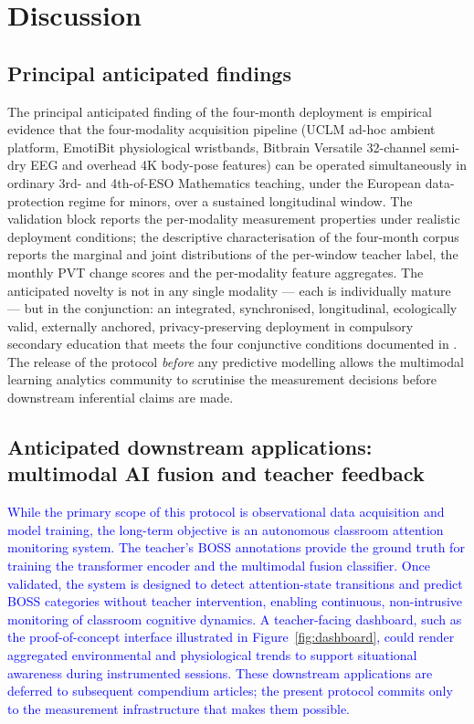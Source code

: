 \section{Discussion}\label{sec:discussion}

\subsection{Principal anticipated findings}\label{subsec:principal-findings}

The principal anticipated finding of the four-month deployment is empirical evidence that the four-modality acquisition pipeline (UCLM ad-hoc ambient platform, EmotiBit physiological wristbands, Bitbrain Versatile 32-channel semi-dry EEG and overhead 4K body-pose features) can be operated simultaneously in ordinary 3rd- and 4th-of-ESO Mathematics teaching, under the European data-protection regime for minors, over a sustained longitudinal window. The validation block reports the per-modality measurement properties under realistic deployment conditions; the descriptive characterisation of the four-month corpus reports the marginal and joint distributions of the per-window teacher label, the monthly PVT change scores and the per-modality feature aggregates. The anticipated novelty is not in any single modality --- each is individually mature --- but in the conjunction: an integrated, synchronised, longitudinal, ecologically valid, externally anchored, privacy-preserving deployment in compulsory secondary education that meets the four conjunctive conditions documented in . The release of the protocol \emph{before} any predictive modelling allows the multimodal learning analytics community to scrutinise the measurement decisions before downstream inferential claims are made.

\subsection{Anticipated downstream applications: multimodal AI fusion and teacher feedback}

\textcolor{blue}{While the primary scope of this protocol is observational data acquisition and model training, the long-term objective is an autonomous classroom attention monitoring system. The teacher's BOSS annotations provide the ground truth for training the transformer encoder and the multimodal fusion classifier. Once validated, the system is designed to detect attention-state transitions and predict BOSS categories without teacher intervention, enabling continuous, non-intrusive monitoring of classroom cognitive dynamics. A teacher-facing dashboard, such as the proof-of-concept interface illustrated in Figure~\ref{fig:dashboard}, could render aggregated environmental and physiological trends to support situational awareness during instrumented sessions. These downstream applications are deferred to subsequent compendium articles; the present protocol commits only to the measurement infrastructure that makes them possible.}

